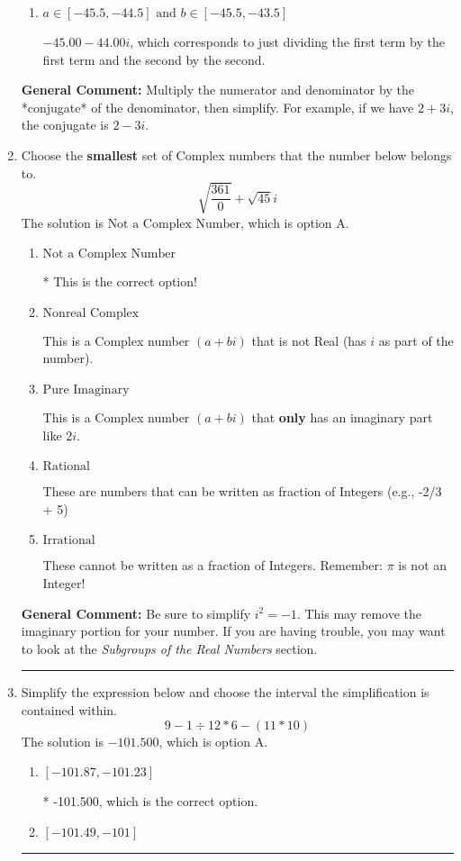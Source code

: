 \documentclass{extbook}[14pt]
\newcommand{\litem}[1]{\item #1

\rule{\textwidth}{0.4pt}}
\begin{document}
\begin{enumerate}
{\begin{enumerate}[label=\Alph*.]
 $-221.00  + 0.40 i$, which corresponds to forgetting to multiply the conjugate by the numerator and using a plus instead of a minus in the denominator.
\item \( a \in [-45.5, -44.5] \text{ and } b \in [-45.5, -43.5] \)

 $-45.00  - 44.00 i$, which corresponds to just dividing the first term by the first term and the second by the second.
\end{enumerate}

\textbf{General Comment:} Multiply the numerator and denominator by the *conjugate* of the denominator, then simplify. For example, if we have $2+3i$, the conjugate is $2-3i$.
}
\litem{
Choose the \textbf{smallest} set of Complex numbers that the number below belongs to.
\[ \sqrt{\frac{361}{0}}+\sqrt{45} i \]
The solution is \( \text{Not a Complex Number} \), which is option A.\begin{enumerate}[label=\Alph*.]
\item \( \text{Not a Complex Number} \)

* This is the correct option!
\item \( \text{Nonreal Complex} \)

This is a Complex number $(a+bi)$ that is not Real (has $i$ as part of the number).
\item \( \text{Pure Imaginary} \)

This is a Complex number $(a+bi)$ that \textbf{only} has an imaginary part like $2i$.
\item \( \text{Rational} \)

These are numbers that can be written as fraction of Integers (e.g., -2/3 + 5)
\item \( \text{Irrational} \)

These cannot be written as a fraction of Integers. Remember: $\pi$ is not an Integer!
\end{enumerate}

\textbf{General Comment:} Be sure to simplify $i^2 = -1$. This may remove the imaginary portion for your number. If you are having trouble, you may want to look at the \textit{Subgroups of the Real Numbers} section.
}
\litem{
Simplify the expression below and choose the interval the simplification is contained within.
\[ 9 - 1 \div 12 * 6 - (11 * 10) \]
The solution is \( -101.500 \), which is option A.\begin{enumerate}[label=\Alph*.]
\item \( [-101.87, -101.23] \)

* -101.500, which is the correct option.
\item \( [-101.49, -101] \)


\end{enumerate}}
\end{enumerate}
\end{document}
